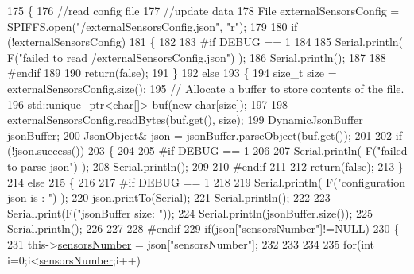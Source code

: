 \begin{DoxyCode}
175 \{
176     \textcolor{comment}{//read config file}
177     \textcolor{comment}{//update data}
178     File externalSensorsConfig = SPIFFS.open(\textcolor{stringliteral}{"/externalSensorsConfig.json"}, \textcolor{stringliteral}{"r"});
179 
180     \textcolor{keywordflow}{if} (!externalSensorsConfig) 
181     \{
182     
183 \textcolor{preprocessor}{    #if DEBUG == 1}
184         
185         Serial.println( F(\textcolor{stringliteral}{"failed to read /externalSensorsConfig.json"}) );
186         Serial.println();
187     
188 \textcolor{preprocessor}{    #endif}
189         
190         \textcolor{keywordflow}{return}(\textcolor{keyword}{false});
191     \}
192     \textcolor{keywordflow}{else}
193     \{
194         \textcolor{keywordtype}{size\_t} size = externalSensorsConfig.size();
195         \textcolor{comment}{// Allocate a buffer to store contents of the file.}
196         std::unique\_ptr<char[]> buf(\textcolor{keyword}{new} \textcolor{keywordtype}{char}[size]);
197 
198         externalSensorsConfig.readBytes(buf.get(), size);
199         DynamicJsonBuffer jsonBuffer;
200         JsonObject& json = jsonBuffer.parseObject(buf.get());
201 
202         \textcolor{keywordflow}{if} (!json.success()) 
203         \{
204         
205 \textcolor{preprocessor}{        #if DEBUG == 1 }
206 
207             Serial.println( F(\textcolor{stringliteral}{"failed to parse json"}) );
208             Serial.println();
209         
210 \textcolor{preprocessor}{        #endif}
211 
212             \textcolor{keywordflow}{return}(\textcolor{keyword}{false});
213         \} 
214         \textcolor{keywordflow}{else}
215         \{
216         
217 \textcolor{preprocessor}{        #if DEBUG == 1 }
218     
219             Serial.println( F(\textcolor{stringliteral}{"configuration json is : "}) );
220             json.printTo(Serial);
221             Serial.println();
222 
223             Serial.print(F(\textcolor{stringliteral}{"jsonBuffer size: "}));
224             Serial.println(jsonBuffer.size());
225             Serial.println();
226 
227         
228 \textcolor{preprocessor}{        #endif          }
229             \textcolor{keywordflow}{if}(json[\textcolor{stringliteral}{"sensorsNumber"}]!=NULL)
230             \{
231                 this->\hyperlink{class_external_sensors_a58e4fbf9adeae787d92be5fa33043b5d}{sensorsNumber} = json[\textcolor{stringliteral}{"sensorsNumber"}];
232                 
233                 
234 
235                 \textcolor{keywordflow}{for}(\textcolor{keywordtype}{int} i=0;i<\hyperlink{class_external_sensors_a58e4fbf9adeae787d92be5fa33043b5d}{sensorsNumber};i++)

\end{DoxyCode}
